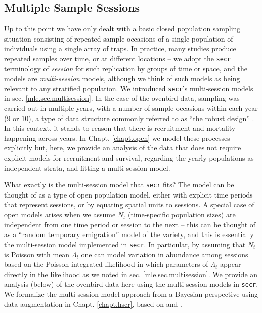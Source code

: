 \subsection{Multiple Sample Sessions}

Up to this point we have only dealt with a basic closed population
sampling situation consisting of repeated sample occasions of a single
population of individuals using a single array of traps. In practice,
many studies produce repeated samples over time, or at different
locations -- we adopt the \mbox{\tt secr} terminology of {\it session}
for such replication by groups of time or space, and the models are
{\it multi-session} models, although we think of such models as being
relevant to any stratified population. We introduced \mbox{\tt secr}'s
multi-session models in sec. \ref{mle.sec.multisession}.  In the case
of the ovenbird data, sampling was carried out in multiple years, with
a number of sample occasions within each year (9 or 10), a type of
data structure commonly referred to as ``the robust
design'' \citep{pollock:1982}.  In this context,
it stands to reason that there is recruitment and mortality happening
across years. In Chapt. \ref{chapt.open} we model these processes
explicitly but, here, we provide an analysis of the data that does not
require explicit models for recruitment and survival, regarding the
yearly populations as independent strata, and fitting a multi-session
model.

What exactly is the multi-session model that \mbox{\tt secr} fits? The
model can be thought of as a type of open population model, either
with explicit time periods that represent sessions, or by equating
spatial units to sessions.
A special case of open models arises when we assume $N_{t}$
(time-specific population sizes) are
independent from one time period or session to the next -- this can be
thought of as a ``random temporary emigration'' model of the
\citet{kendall_etal:1997} variety, and this is essentially the
multi-session model implemented in \mbox{\tt secr}.  In particular, by
assuming that $N_{t}$ is Poisson with mean $\Lambda_{t}$ one can model
variation in abundance among sessions based on the Poisson-integrated
likelihood in which parameters of $\Lambda_{t}$ appear directly in the
likelihood as we noted in sec. \ref{mle.sec.multisession}.  We provide
an analysis (below) of the ovenbird data here using the multi-session models
in  \mbox{\tt secr}.
We formalize the multi-session model approach from a Bayesian
perspective using data augmentation
in Chapt. \ref{chapt.hscr}, based on \citet{converse_royle:2012} and
\citet{royle_converse:2013}.

